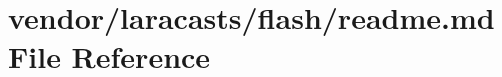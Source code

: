 \section{vendor/laracasts/flash/readme.md File Reference}
\label{vendor_2laracasts_2flash_2readme_8md}
